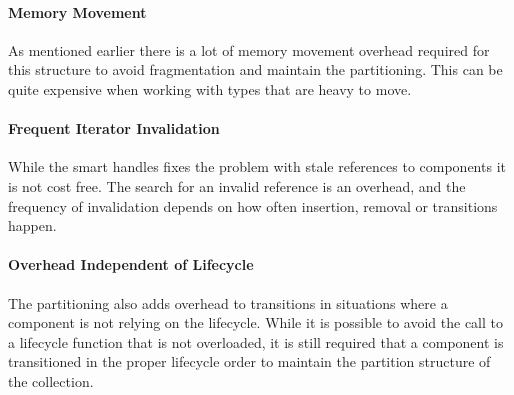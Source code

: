 \paragraph{Memory Movement}
As mentioned earlier there is a lot of memory movement overhead required for this structure to avoid fragmentation and
maintain the partitioning. This can be quite expensive when working with types that are heavy to move.

\paragraph{Frequent Iterator Invalidation}
While the smart handles fixes the problem with stale references to components it is not cost free.
The search for an invalid reference is an overhead, and the frequency of invalidation depends on how often insertion,
removal or transitions happen.

\paragraph{Overhead Independent of Lifecycle}
The partitioning also adds overhead to transitions in situations where a component is not relying on the lifecycle.
While it is possible to avoid the call to a lifecycle function that is not overloaded, it is still required
that a component is transitioned in the proper lifecycle order to maintain the partition structure of the collection.
